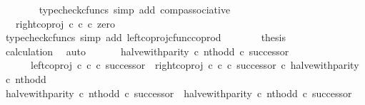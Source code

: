 \begin{isabellebody}
\ \ \ \ \ \ \isamarkupfalse%
\ {\isacharparenleft}{\kern0pt}typecheck{\isacharunderscore}{\kern0pt}cfuncs{\isacharcomma}{\kern0pt}\ simp\ add{\isacharcolon}{\kern0pt}\ comp{\isacharunderscore}{\kern0pt}associative{}{\isacharparenright}{\kern0pt}\isanewline
\ \ \ \ \isamarkupfalse%
\ \isamarkupfalse%
\ {\isachardoublequoteopen}{\isachardot}{\kern0pt}{\isachardot}{\kern0pt}{\isachardot}{\kern0pt}\ {\isacharequal}{\kern0pt}\ right{\isacharunderscore}{\kern0pt}coproj\ {\isasymnat}\isactrlsub c\ {\isasymnat}\isactrlsub c\ {\isasymcirc}\isactrlsub c\ zero{\isachardoublequoteclose}\isanewline
\ \ \ \ \ \ \isamarkupfalse%
\ {\isacharparenleft}{\kern0pt}typecheck{\isacharunderscore}{\kern0pt}cfuncs{\isacharcomma}{\kern0pt}\ simp\ add{\isacharcolon}{\kern0pt}\ left{\isacharunderscore}{\kern0pt}coproj{\isacharunderscore}{\kern0pt}cfunc{\isacharunderscore}{\kern0pt}coprod{\isacharparenright}{\kern0pt}\isanewline
\ \ \ \ \isamarkupfalse%
\ \isamarkupfalse%
\ {\isacharquery}{\kern0pt}thesis\isanewline
\ \ \ \ \ \ \isamarkupfalse%
\ calculation\ \isamarkupfalse%
\ auto\isanewline
\ \ \isamarkupfalse%
\isanewline
\isanewline
\ \ \isamarkupfalse%
\ {\isachardoublequoteopen}{\isacharparenleft}{\kern0pt}halve{\isacharunderscore}{\kern0pt}with{\isacharunderscore}{\kern0pt}parity\ {\isasymcirc}\isactrlsub c\ nth{\isacharunderscore}{\kern0pt}odd{\isacharparenright}{\kern0pt}\ {\isasymcirc}\isactrlsub c\ successor\ {\isacharequal}{\kern0pt}\isanewline
\ \ \ \ \ \ {\isacharparenleft}{\kern0pt}left{\isacharunderscore}{\kern0pt}coproj\ {\isasymnat}\isactrlsub c\ {\isasymnat}\isactrlsub c\ {\isasymcirc}\isactrlsub c\ successor{\isacharparenright}{\kern0pt}\ {\isasymamalg}\ {\isacharparenleft}{\kern0pt}right{\isacharunderscore}{\kern0pt}coproj\ {\isasymnat}\isactrlsub c\ {\isasymnat}\isactrlsub c\ {\isasymcirc}\isactrlsub c\ successor{\isacharparenright}{\kern0pt}\ {\isasymcirc}\isactrlsub c\ halve{\isacharunderscore}{\kern0pt}with{\isacharunderscore}{\kern0pt}parity\ {\isasymcirc}\isactrlsub c\ nth{\isacharunderscore}{\kern0pt}odd{\isachardoublequoteclose}\isanewline
\ \ \isamarkupfalse%
\ {\isacharminus}{\kern0pt}\isanewline
\ \ \ \ \isamarkupfalse%
\ {\isachardoublequoteopen}{\isacharparenleft}{\kern0pt}halve{\isacharunderscore}{\kern0pt}with{\isacharunderscore}{\kern0pt}parity\ {\isasymcirc}\isactrlsub c\ nth{\isacharunderscore}{\kern0pt}odd{\isacharparenright}{\kern0pt}\ {\isasymcirc}\isactrlsub c\ successor\ {\isacharequal}{\kern0pt}\ halve{\isacharunderscore}{\kern0pt}with{\isacharunderscore}{\kern0pt}parity\ {\isasymcirc}\isactrlsub c\ nth{\isacharunderscore}{\kern0pt}odd\ {\isasymcirc}\isactrlsub c\ successor{\isachardoublequoteclose}\isanewline

\end{isabellebody}
